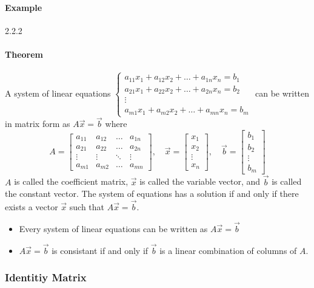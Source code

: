 \paragraph*{Example} 2.2.2

\paragraph*{Theorem}
A system of linear equations $\begin{cases}
a_{11}x_1 + a_{12}x_2 + \ldots + a_{1n}x_n = b_1 \\
a_{21}x_1 + a_{22}x_2 + \ldots + a_{2n}x_n = b_2 \\
\vdots \\
a_{m1}x_1 + a_{m2}x_2 + \ldots + a_{mn}x_n = b_m
\end{cases}$ can be written in matrix form as $A\vec{x} = \vec{b}$ where
\[A = \begin{bmatrix}
    a_{11} & a_{12} & \ldots & a_{1n} \\
    a_{21} & a_{22} & \ldots & a_{2n} \\
    \vdots & \vdots & \ddots & \vdots \\
    a_{m1} & a_{m2} & \ldots & a_{mn}
\end{bmatrix}, \quad \vec{x} = \begin{bmatrix}
    x_1 \\
    x_2 \\
    \vdots \\
    x_n
\end{bmatrix}, \quad \vec{b} = \begin{bmatrix}
    b_1 \\
    b_2 \\
    \vdots \\
    b_m
\end{bmatrix}\] 
$A$ is called the coefficient matrix, $\vec{x}$ is called the variable vector, and $\vec{b}$ is called the constant vector. The system of equations has a solution if and only if there exists a vector $\vec{x}$ such that $A\vec{x} = \vec{b}$.
\begin{itemize}
    \item Every system of linear equations can be written as $A\vec{x} = \vec{b}$ 
    \item $A\vec{x} = \vec{b}$ is consistant if and only if $\vec{b}$ is a linear combination of columns of $A$.
\end{itemize}

\subsubsection*{Identitiy Matrix}
